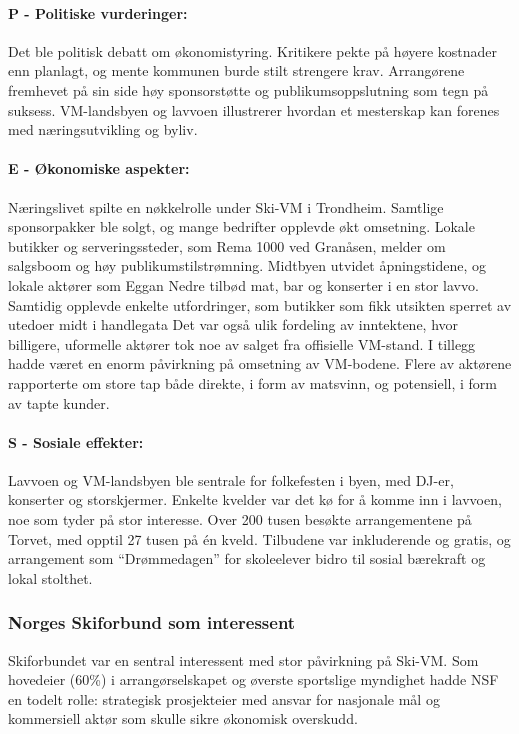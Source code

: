 \paragraph{P - Politiske vurderinger:}
Det ble politisk debatt om økonomistyring. Kritikere pekte på høyere kostnader enn planlagt, og mente kommunen burde stilt strengere krav\parencite{nettavisenKritikk}. Arrangørene fremhevet på sin side høy sponsorstøtte og publikumsoppslutning som tegn på suksess\parencite{kom24Sponsorsalg}. VM-landsbyen og lavvoen illustrerer hvordan et mesterskap kan forenes med næringsutvikling og byliv.

\paragraph{E - Økonomiske aspekter:}
Næringslivet spilte en nøkkelrolle under Ski-VM i Trondheim. Samtlige sponsorpakker ble solgt, og mange bedrifter opplevde økt omsetning\parencite{kom24Sponsorsalg}. Lokale butikker og serveringssteder, som Rema 1000 ved Granåsen, melder om salgsboom og høy publikumstilstrømning\parencite{nettavisenRema}. Midtbyen utvidet åpningstidene, og lokale aktører som Eggan Nedre tilbød mat, bar og konserter i en stor lavvo\parencite{midtbyenProgram}. Samtidig opplevde enkelte utfordringer, som butikker som fikk utsikten sperret av utedoer midt i handlegata\parencite{nettavisenToalett} Det var også ulik fordeling av inntektene, hvor billigere, uformelle aktører tok noe av salget fra offisielle VM-stand\parencite{nettavisenRema}. I tillegg hadde været en enorm påvirkning på omsetning av VM-bodene. Flere av aktørene rapporterte om store tap både direkte, i form av matsvinn, og potensiell, i form av tapte kunder\parencite{innherredTragedie}.

\paragraph{S - Sosiale effekter:}
Lavvoen og VM-landsbyen ble sentrale for folkefesten i byen, med DJ-er, konserter og 
storskjermer. Enkelte kvelder var det kø for å komme inn i lavvoen, noe som tyder på stor 
interesse. Over 200 tusen besøkte arrangementene på Torvet, med opptil 27 tusen på én kveld\parencite{wikipediaSkiVM}. 
Tilbudene var inkluderende og gratis, og arrangement som “Drømmedagen” for skoleelever bidro til 
sosial bærekraft og lokal stolthet\parencite{wikipediaSkiVM}.

\subsubsection{Norges Skiforbund som interessent}
Skiforbundet var en sentral interessent med stor påvirkning på Ski-VM. Som hovedeier (60\%) i arrangørselskapet og øverste sportslige myndighet hadde NSF en todelt rolle: strategisk prosjekteier med ansvar for nasjonale mål og kommersiell aktør som skulle sikre økonomisk overskudd\parencite{ProffSkiVM2025}.

